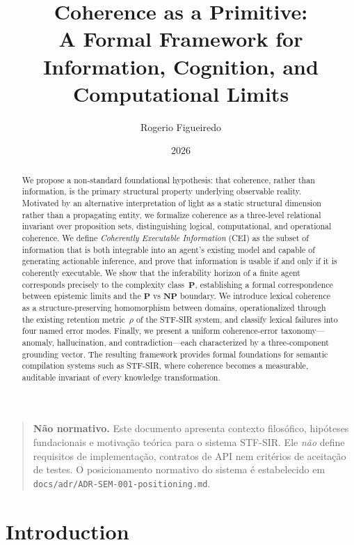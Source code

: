 \documentclass{article}
\title{Coherence as a Primitive:\\
A Formal Framework for Information, Cognition, and Computational Limits}
\author{Rogerio Figueiredo}
\date{2026}
\newcommand{\STF}{{\normalfont\textsc{STF}}}
\newcommand{\SIR}{{\normalfont\textsc{SIR}}}
\begin{document}
\maketitle

\begin{quote}
\textbf{Não normativo.}
Este documento apresenta contexto filosófico, hipóteses fundacionais e
motivação teórica para o sistema \STF{}-\SIR{}.
Ele \emph{não} define requisitos de implementação, contratos de API nem
critérios de aceitação de testes.
O posicionamento normativo do sistema é estabelecido em
\texttt{docs/adr/ADR-SEM-001-positioning.md}.
\end{quote}

\begin{abstract}
We propose a non-standard foundational hypothesis: that coherence, rather than
information, is the primary structural property underlying observable reality.
Motivated by an alternative interpretation of light as a static structural
dimension rather than a propagating entity, we formalize coherence as a
three-level relational invariant over proposition sets, distinguishing logical,
computational, and operational coherence.  We define \emph{Coherently Executable
Information} (CEI) as the subset of information that is both integrable into an
agent's existing model and capable of generating actionable inference, and prove
that information is usable if and only if it is coherently executable.  We show
that the inferability horizon of a finite agent corresponds precisely to the
complexity class~$\mathbf{P}$, establishing a formal correspondence between
epistemic limits and the $\mathbf{P}$ vs $\mathbf{NP}$ boundary.  We introduce
lexical coherence as a structure-preserving homomorphism between domains,
operationalized through the existing retention metric~$\rho$ of the \STF{}-\SIR{}
system, and classify lexical failures into four named error modes.  Finally, we
present a uniform coherence-error taxonomy---anomaly, hallucination, and
contradiction---each characterized by a three-component grounding vector.  The
resulting framework provides formal foundations for semantic compilation systems
such as \STF{}-\SIR{}, where coherence becomes a measurable, auditable invariant
of every knowledge transformation.
\end{abstract}

\section{Introduction}
\end{document}
